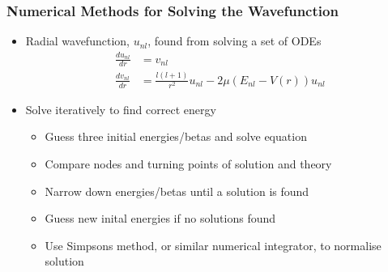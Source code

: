 \documentclass[mathserif, 10pt,usenames,dvipsnames]{beamer}
\begin{document}
\begin{frame}
    \frametitle{Numerical Methods for Solving the Wavefunction}
    \begin{itemize}
        \item Radial wavefunction, $u_{nl}$, found from solving a set of ODEs
            \begin{align}
                \frac{du_{nl}}{dr} &= v_{nl} \\
                \frac{dv_{nl}}{dr} &= \frac{l(l+1)}{r^2}u_{nl} -2\mu(E_{nl} - V(r))u_{nl}
            \end{align}
        \item Solve iteratively to find correct energy
            \begin{itemize}
                \item Guess three initial energies/betas and solve equation
                \item Compare nodes and turning points of solution and theory
                \item Narrow down energies/betas until a solution is found
                \item Guess new inital energies if no solutions found
                \item Use Simpsons method, or similar numerical integrator, to normalise solution
            \end{itemize}
    \end{itemize}
\end{frame}
\end{document}
